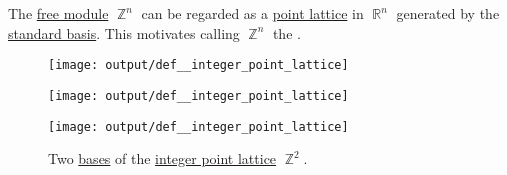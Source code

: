 \begin{definition}\label{def:integer_point_lattice}\mimprovised
  The \hyperref[def:free_semimodule]{free module} \( \BbbZ^n \) can be regarded as a \hyperref[def:point_lattice]{point lattice} in \( \BbbR^n \) generated by the \hyperref[def:sequence_space]{standard basis}. This motivates calling \( \BbbZ^n \) the .

  \begin{figure}[!ht]
    \begin{subcaptionblock}{0.3\textwidth}
      \centering
      \texttt{[image: output/def\_\_integer\_point\_lattice]}
    \end{subcaptionblock}
    \hfill
    \begin{subcaptionblock}{0.3\textwidth}
      \centering
      \texttt{[image: output/def\_\_integer\_point\_lattice]}
    \end{subcaptionblock}
    \hfill
    \begin{subcaptionblock}{0.3\textwidth}
      \centering
      \texttt{[image: output/def\_\_integer\_point\_lattice]}
    \end{subcaptionblock}
    \caption{Two \hyperref[def:point_lattice_basis]{bases} of the \hyperref[def:integer_point_lattice]{integer point lattice} \( \BbbZ^2 \).}\label{fig:def:integer_point_lattice}
  \end{figure}
\end{definition}
